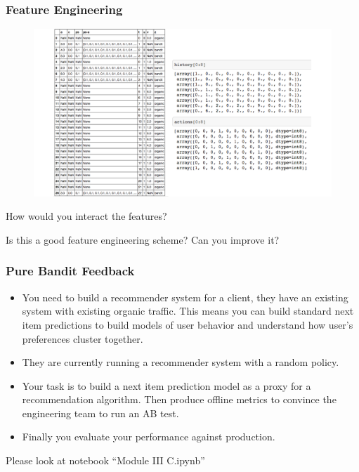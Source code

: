 \begin{frame}
  \frametitle{Feature Engineering}
\begin{figure}[h!]
\includegraphics[scale=0.3]{images/feature_engineering.png}
\centering
\end{figure}

\pause
How would you interact the features?

\pause
Is this a good feature engineering scheme?  Can you improve it?
\end{frame}




\begin{frame}
  \frametitle{Pure Bandit Feedback}

    \begin{itemize}
      \item You need to build a recommender system for a client, they have an existing system with existing organic traffic.  \pause This means you can build standard next item predictions to build models of user behavior and understand how user's preferences cluster together. \pause
      \item They are currently running a recommender system with a random policy. \pause
      \item Your task is to build a next item prediction model as a proxy for a recommendation algorithm.  Then produce offline metrics to convince the engineering team to run an AB test.\pause
      \item Finally you evaluate your performance against production.
    \end{itemize}

    \pause
    Please look at notebook ``Module III C.ipynb''

\end{frame}


